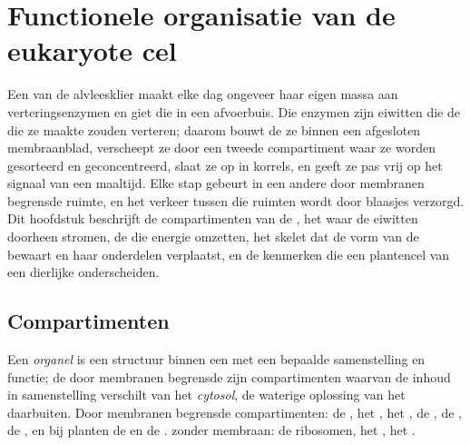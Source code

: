 \chapter{Functionele organisatie van de eukaryote cel}\label{ch:b1:eukaryotic-cell}

Een  van de alvleesklier maakt elke dag ongeveer haar eigen massa aan
verteringsenzymen en giet die in een afvoerbuis. Die enzymen zijn eiwitten die de
 die ze maakte zouden verteren; daarom bouwt de  ze binnen een afgesloten
membraanblad, verscheept ze door een tweede compartiment waar ze worden gesorteerd
en geconcentreerd, slaat ze op in korrels, en geeft ze pas vrij op het signaal
van een maaltijd. Elke stap gebeurt in een andere door membranen begrensde
ruimte, en het verkeer tussen die ruimten wordt door blaasjes verzorgd. Dit
hoofdstuk beschrijft de compartimenten van de , het
 waar de eiwitten doorheen stromen, de  die energie
omzetten, het skelet dat de vorm van de  bewaart en haar onderdelen verplaatst,
en de kenmerken die een plantencel van een dierlijke onderscheiden.

\section{Compartimenten}

\begin{definition}\label{def:b1:eukaryotic-cell:organelle}
Een \emph{organel} is een structuur binnen een  met een
bepaalde samenstelling en functie; de door membranen begrensde  zijn
compartimenten waarvan de inhoud in samenstelling verschilt van het
\emph{cytosol}, de waterige oplossing van het  daarbuiten.
Door membranen begrensde compartimenten: de , het , het , de , de , de , en
bij planten de  en de .  zonder membraan: de ribosomen,
het , het .
\end{definition}

